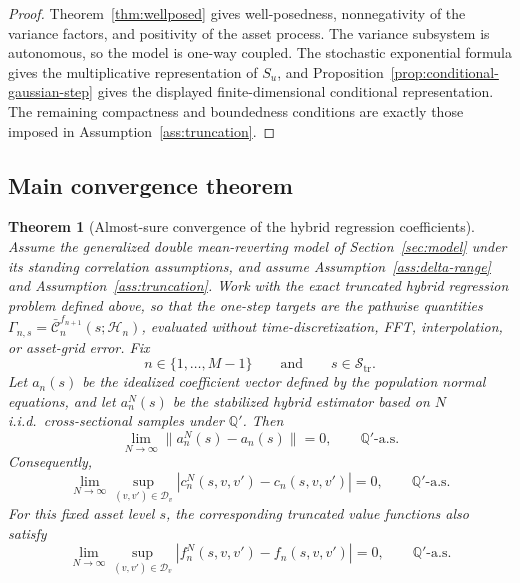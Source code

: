 \documentclass[pdflatex,sn-mathphys-num]{sn-jnl}
\theoremstyle{thmstyleone}%
\newtheorem{theorem}{Theorem}[section]
\theoremstyle{thmstylethree}%
\theoremstyle{thmstyletwo}%
\newcommand{\Q}{\mathbb Q}
\begin{document}
\begin{proof}
Theorem~\ref{thm:wellposed} gives well-posedness, nonnegativity of the variance
factors, and positivity of the asset process. The variance subsystem is
autonomous, so the model is one-way coupled. The stochastic exponential formula
gives the multiplicative representation of $S_u$, and
Proposition~\ref{prop:conditional-gaussian-step} gives the displayed
finite-dimensional conditional representation. The remaining compactness and
boundedness conditions are exactly those imposed in Assumption~\ref{ass:truncation}.
\end{proof}



\subsection{Main convergence theorem}
\label{subsec:main_convergence}

\begin{theorem}[Almost-sure convergence of the hybrid regression coefficients]
\label{thm:as_coeff_convergence}
Assume the generalized double mean-reverting model of
Section~\ref{sec:model} under its standing correlation assumptions, and assume
Assumption~\ref{ass:delta-range} and Assumption~\ref{ass:truncation}. Work with
the exact truncated hybrid regression problem defined above, so that the
one-step targets are the pathwise quantities
$\Gamma_{n,s}=\bar{\mathcal C}_n^{f_{n+1}}(s;\mathcal H_n)$, evaluated without
time-discretization, FFT, interpolation, or asset-grid error. Fix
\[
    n\in\{1,\ldots,M-1\}
    \qquad\text{and}\qquad
    s\in\mathcal S_{\mathrm{tr}}.
\]
Let $a_n(s)$ be the idealized coefficient vector defined by the population
normal equations, and let $a_n^N(s)$ be the stabilized hybrid estimator based on
$N$ i.i.d.\ cross-sectional samples under $\Q'$.
Then
\[
    \lim_{N\to\infty}
    \|a_n^N(s)-a_n(s)\|
    =
    0,
    \qquad
    \Q'\text{-a.s.}
\]
Consequently,
\[
    \lim_{N\to\infty}
    \sup_{(v,v')\in\mathcal D_v}
    |c_n^N(s,v,v')-c_n(s,v,v')|
    =
    0,
    \qquad
    \Q'\text{-a.s.}
\]
For this fixed asset level $s$, the corresponding truncated value functions
also satisfy
\[
    \lim_{N\to\infty}
    \sup_{(v,v')\in\mathcal D_v}
    |f_n^N(s,v,v')-f_n(s,v,v')|
    =
    0,
    \qquad
    \Q'\text{-a.s.}
\]
\end{theorem}
\end{document}
